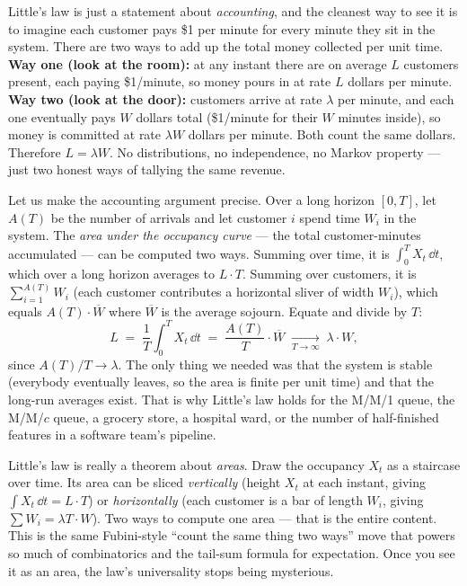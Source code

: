 \begin{intuitionbox}
Little's law is just a statement about \emph{accounting}, and the cleanest way to see it is to
imagine each customer pays \$1 per minute for every minute they sit in the system. There are two ways
to add up the total money collected per unit time. \textbf{Way one (look at the room):} at any
instant there are on average $L$ customers present, each paying \$1/minute, so money pours in at rate
$L$ dollars per minute. \textbf{Way two (look at the door):} customers arrive at rate $\lambda$ per
minute, and each one eventually pays $W$ dollars total (\$1/minute for their $W$ minutes inside), so
money is committed at rate $\lambda W$ dollars per minute. Both count the same dollars. Therefore
$L = \lambda W$. No distributions, no independence, no Markov property --- just two honest ways of
tallying the same revenue.
\end{intuitionbox}

\begin{whybox}
Let us make the accounting argument precise. Over a long horizon $[0, T]$, let $A(T)$ be the number
of arrivals and let customer $i$ spend time $W_i$ in the system. The \emph{area under the
occupancy curve} --- the total customer-minutes accumulated --- can be computed two ways. Summing
over time, it is $\int_0^T X_t\,\dd t$, which over a long horizon averages to $L \cdot T$. Summing
over customers, it is $\sum_{i=1}^{A(T)} W_i$ (each customer contributes a horizontal sliver of
width $W_i$), which equals $A(T) \cdot \overline{W}$ where $\overline{W}$ is the average sojourn.
Equate and divide by $T$:
\[
  L \;=\; \frac{1}{T}\int_0^T X_t\,\dd t
       \;=\; \frac{A(T)}{T}\cdot \overline{W}
       \;\xrightarrow[T \to \infty]{}\; \lambda \cdot W,
\]
since $A(T)/T \to \lambda$. The only thing we needed was that the system is stable (everybody
eventually leaves, so the area is finite per unit time) and that the long-run averages exist. That is
why Little's law holds for the M/M/1 queue, the M/M/$c$ queue, a grocery store, a hospital ward, or
the number of half-finished features in a software team's pipeline.
\end{whybox}

\begin{happeningbox}
Little's law is really a theorem about \emph{areas}. Draw the occupancy $X_t$ as a staircase over
time. Its area can be sliced \emph{vertically} (height $X_t$ at each instant, giving
$\int X_t\,\dd t = L \cdot T$) or \emph{horizontally} (each customer is a bar of length $W_i$, giving
$\sum W_i = \lambda T \cdot W$). Two ways to compute one area --- that is the entire content. This is
the same Fubini-style ``count the same thing two ways'' move that powers so much of combinatorics and
the tail-sum formula for expectation. Once you see it as an area, the law's universality stops being
mysterious.
\end{happeningbox}


